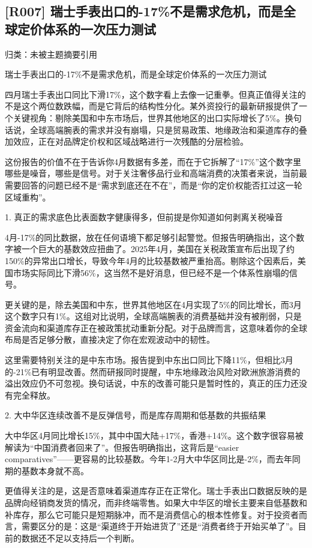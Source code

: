 \documentclass[11pt]{ctexart}
\begin{document}
\subsection{[R007] 瑞士手表出口的-17\%不是需求危机，而是全球定价体系的一次压力测试}
{\small\color{refgray}归类：未被主题摘要引用}

瑞士手表出口的-17\%不是需求危机，而是全球定价体系的一次压力测试

四月瑞士手表出口同比下滑17\%，这个数字看上去像一记重拳。但真正值得关注的不是这个两位数跌幅，而是它背后的结构性分化。某外资投行的最新研报提供了一个关键视角：剔除美国和中东市场后，世界其他地区的出口实际增长了5\%。换句话说，全球高端腕表的需求并没有崩塌，只是贸易政策、地缘政治和渠道库存的叠加效应，正在对品牌定价权和区域战略进行一次残酷的分层检验。

这份报告的价值不在于告诉你4月数据有多差，而在于它拆解了“17\%”这个数字里哪些是噪音，哪些是信号。对于关注奢侈品行业和高端消费的决策者来说，当前最需要回答的问题已经不是“需求到底还在不在”，而是“你的定价权能否扛过这一轮区域重构”。

1. 真正的需求底色比表面数字健康得多，但前提是你知道如何剥离关税噪音

4月-17\%的同比数据，放在任何语境下都足够引起警觉。但报告明确指出，这个数字被一个巨大的基数效应扭曲了。2025年4月，美国在关税政策宣布后出现了约150\%的异常出口增长，导致今年4月的比较基数被严重抬高。剔除这个因素后，美国市场实际同比下滑56\%，这当然不是好消息，但已经不是一个体系性崩塌的信号。

更关键的是，除去美国和中东，世界其他地区在4月实现了5\%的同比增长，而3月这个数字只有1\%。这组对比说明，全球高端腕表的消费基础并没有被削弱，只是资金流向和渠道库存正在被政策扰动重新分配。对于品牌而言，这意味着你的全球布局是否足够分散，直接决定了你在宏观波动中的韧性。

这里需要特别关注的是中东市场。报告提到中东出口同比下降11\%，但相比3月的-21\%已有明显改善。然而研报同时提醒，中东地缘政治风险对欧洲旅游消费的溢出效应仍不可忽视。换句话说，中东的改善可能只是暂时性的，真正的压力还没有完全释放。

2. 大中华区连续改善不是反弹信号，而是库存周期和低基数的共振结果

大中华区4月同比增长15\%，其中中国大陆+17\%，香港+14\%。这个数字很容易被解读为“中国消费者回来了”。但报告明确指出，这背后是“easier comparatives”——更容易的比较基数。今年1-2月大中华区同比是-2\%，而去年同期的基数本身就不高。

更值得关注的是，这是否意味着渠道库存正在正常化。瑞士手表出口数据反映的是品牌向经销商发货的情况，而非终端零售。如果大中华区的增长主要来自低基数和补库存，那么它可能只是短期脉冲，而不是消费信心的根本性修复。对于投资者而言，需要区分的是：这是“渠道终于开始进货了”还是“消费者终于开始买单了”。目前的数据还不足以支持后一个判断。
\end{document}
